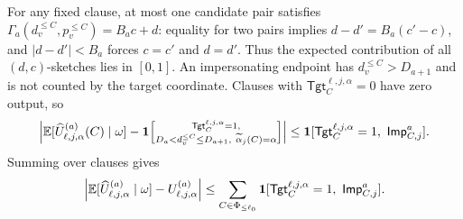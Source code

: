 For any fixed clause, at most one candidate pair satisfies $\Gamma_a(d_v^{\le C},p_v^{\le C})=B_ac+d$: equality for two pairs implies $d-d'=B_a(c'-c)$, and $|d-d'|<B_a$ forces $c=c'$ and $d=d'$. Thus the expected contribution of all $(d,c)$-sketches lies in $[0,1]$. An impersonating endpoint has $d_v^{\le C}>D_{a+1}$ and is not counted by the target coordinate. Clauses with $\mathsf{Tgt}^{\ell,j,\alpha}_{C}=0$ have zero output, so
\begin{equation}\label{eq:one-endpoint-low-coordinate}
\begin{aligned}
\left|
\mathbb E[\widehat U^{(a)}_{\ell,j,\alpha}(C)\mid\omega]
-\mathbf 1\!\left[\substack{\mathsf{Tgt}^{\ell,j,\alpha}_{C}=1,\\
D_a<d_v^{\le C}\le D_{a+1},\
\widetilde\alpha_j(C)=\alpha}\right]
\right|
\le\mathbf 1[\mathsf{Tgt}^{\ell,j,\alpha}_{C}=1,\ \mathsf{Imp}^{a}_{C,j}].
\end{aligned}
\end{equation}
Summing over clauses gives
\begin{equation}\label{eq:one-endpoint-low-coordinate-total}
\left|
\mathbb E[\widehat U^{(a)}_{\ell,j,\alpha}\mid\omega]
-U^{(a)}_{\ell,j,\alpha}
\right|
\le\sum_{C\in\Phi_{\le\ell_0}}
\1[\mathsf{Tgt}^{\ell,j,\alpha}_{C}=1,\ \mathsf{Imp}^{a}_{C,j}].
\end{equation}
